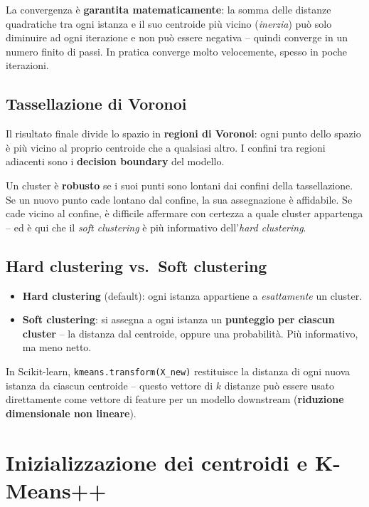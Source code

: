 La convergenza è \textbf{garantita matematicamente}: la somma delle distanze quadratiche tra ogni istanza e il suo centroide più vicino (\emph{inerzia}) può solo diminuire ad ogni iterazione e non può essere negativa -- quindi converge in un numero finito di passi. In pratica converge molto velocemente, spesso in poche iterazioni.

\subsection{Tassellazione di Voronoi}

Il risultato finale divide lo spazio in \textbf{regioni di Voronoi}: ogni punto dello spazio è più vicino al proprio centroide che a qualsiasi altro. I confini tra regioni adiacenti sono i \textbf{decision boundary} del modello.

\begin{notebox}
Un cluster è \textbf{robusto} se i suoi punti sono lontani dai confini della tassellazione. Se un nuovo punto cade lontano dal confine, la sua assegnazione è affidabile. Se cade vicino al confine, è difficile affermare con certezza a quale cluster appartenga -- ed è qui che il \emph{soft clustering} è più informativo dell'\emph{hard clustering}.
\end{notebox}

\subsection{Hard clustering vs.\ Soft clustering}

\begin{itemize}
    \item \textbf{Hard clustering} (default): ogni istanza appartiene a \emph{esattamente} un cluster.
    \item \textbf{Soft clustering}: si assegna a ogni istanza un \textbf{punteggio per ciascun cluster} -- la distanza dal centroide, oppure una probabilità. Più informativo, ma meno netto.
\end{itemize}

In Scikit-learn, \texttt{kmeans.transform(X\_new)} restituisce la distanza di ogni nuova istanza da ciascun centroide -- questo vettore di $k$ distanze può essere usato direttamente come vettore di feature per un modello downstream (\textbf{riduzione dimensionale non lineare}).

\section{Inizializzazione dei centroidi e K-Means++}

